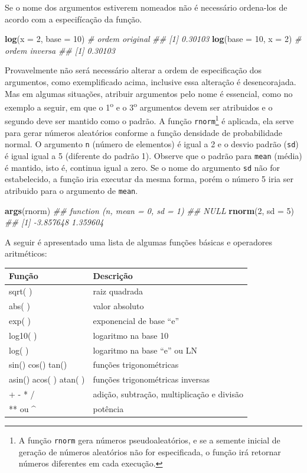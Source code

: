 \documentclass[
  11pt,
  a5paper,
  openany]{book}
\newenvironment{Shaded}{\begin{snugshade}}{\end{snugshade}}
\newcommand{\CommentTok}[1]{\textcolor[rgb]{0.56,0.35,0.01}{\textit{#1}}}
\newcommand{\DataTypeTok}[1]{\textcolor[rgb]{0.13,0.29,0.53}{#1}}
\newcommand{\DecValTok}[1]{\textcolor[rgb]{0.00,0.00,0.81}{#1}}
\newcommand{\KeywordTok}[1]{\textcolor[rgb]{0.13,0.29,0.53}{\textbf{#1}}}
\newcommand{\NormalTok}[1]{#1}
\begin{document}
Se o nome dos argumentos estiverem nomeados não é necessário ordena-los de acordo com a especifícação da função.

\begin{Shaded}
\begin{Highlighting}[]
\KeywordTok{log}\NormalTok{(}\DataTypeTok{x =} \DecValTok{2}\NormalTok{, }\DataTypeTok{base =} \DecValTok{10}\NormalTok{) }\CommentTok{# ordem original}
\CommentTok{## [1] 0.30103}
\KeywordTok{log}\NormalTok{(}\DataTypeTok{base =} \DecValTok{10}\NormalTok{, }\DataTypeTok{x =} \DecValTok{2}\NormalTok{) }\CommentTok{# ordem inversa}
\CommentTok{## [1] 0.30103}
\end{Highlighting}
\end{Shaded}

Provavelmente não será necessário alterar a ordem de especificação dos argumentos, como exemplificado acima, inclusive essa alteração é desencorajada. Mas em algumas situações, atribuir argumentos pelo nome é essencial, como no exemplo a seguir, em que o 1\textsuperscript{o} e o 3\textsuperscript{o} argumentos devem ser atribuidos e o segundo deve ser mantido como o padrão. A função \texttt{rnorm}\footnote{A função \texttt{rnorm} gera números pseudoaleatórios, e se a semente inicial de geração de números aleatórios não for especificada, o função irá retornar números diferentes em cada execução.} é aplicada, ela serve para gerar números aleatórios conforme a função densidade de probabilidade normal. O argumento \texttt{n} (número de elementos) é igual a 2 e o desvio padrão (\texttt{sd}) é igual igual a 5 (diferente do padrão 1). Observe que o padrão para \texttt{mean} (média) é mantido, isto é, continua igual a zero. Se o nome do argumento \texttt{sd} não for estabelecido, a função iria executar da mesma forma, porém o número 5 iria ser atribuido para o argumento de \texttt{mean}.

\begin{Shaded}
\begin{Highlighting}[]
\KeywordTok{args}\NormalTok{(rnorm)}
\CommentTok{## function (n, mean = 0, sd = 1) }
\CommentTok{## NULL}
\KeywordTok{rnorm}\NormalTok{(}\DecValTok{2}\NormalTok{, }\DataTypeTok{sd =} \DecValTok{5}\NormalTok{)}
\CommentTok{## [1] -3.857648  1.359604}
\end{Highlighting}
\end{Shaded}

A seguir é apresentado uma lista de algumas funções básicas e operadores aritméticos:

\begin{longtable}[]{@{}ll@{}}
\toprule
Função & Descrição\tabularnewline
\midrule
\endhead
sqrt( ) & raiz quadrada\tabularnewline
abs( ) & valor absoluto\tabularnewline
exp( ) & exponencial de base ``e''\tabularnewline
log10( ) & logaritmo na base 10\tabularnewline
log( ) & logaritmo na base ``e'' ou LN\tabularnewline
sin() cos() tan() & funções trigonométricas\tabularnewline
asin() acos( ) atan( ) & funções trigonométricas inversas\tabularnewline
+ - * / & adição, subtração, multiplicação e divisão\tabularnewline
** ou \^{} & potência\tabularnewline
\bottomrule
\end{longtable}
\end{document}
